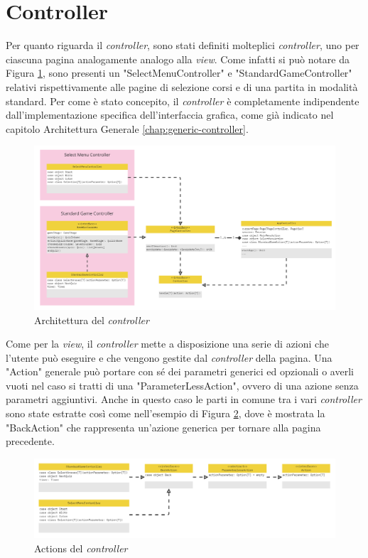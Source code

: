     \section{Controller}

    Per quanto riguarda il \textit{controller}, sono stati definiti molteplici \textit{controller}, uno per ciascuna pagina analogamente analogo alla \textit{view}. Come infatti si può notare da Figura \ref{fig:controller-page}, sono presenti un "SelectMenuController" e "StandardGameController" relativi rispettivamente alle pagine di selezione corsi e di una partita in modalità standard. Per come è stato concepito, il \textit{controller} è completamente indipendente dall'implementazione specifica dell'interfaccia grafica, come già indicato nel capitolo Architettura Generale \ref{chap:generic-controller}. 
    
    \begin{figure}[H]
        \centering
        \includegraphics[width=\textwidth]{Miro/page_controller.png}
        \caption{Architettura del \textit{controller}}
        \label{fig:controller-page}
    \end{figure}

    Come per la \textit{view}, il \textit{controller} mette a disposizione una serie di azioni che l'utente può eseguire e che vengono gestite dal \textit{controller} della pagina. Una "Action" generale può portare con sé dei parametri generici ed opzionali o averli vuoti nel caso si tratti di una "ParameterLessAction", ovvero di una azione senza parametri aggiuntivi. Anche in questo caso le parti in comune tra i vari \textit{controller} sono state estratte così come nell'esempio di Figura \ref{fig:controller-actions}, dove è mostrata la "BackAction" che rappresenta un'azione generica per tornare alla pagina precedente.
    
    \begin{figure}[H]
        \centering
        \includegraphics[width=\textwidth]{Miro/actions_controller.png}
        \caption{Actions del \textit{controller}}
        \label{fig:controller-actions}
    \end{figure}

